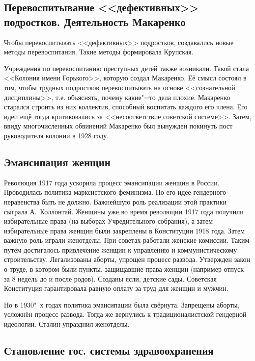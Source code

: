 \subsection{Перевоспитывание <<дефективных>> подростков. Деятельность Макаренко}

Чтобы перевоспитывать <<дефективных>> подростков, создавались новые методы перевоспитания. Такие методы формировала Крупская.

Учреждения по перевоспитанию преступных детей также возникали. Такой стала <<Колония имени Горького>>, которую создал Макаренко. Её смысл состоял в том, чтобы трудных подростков перевоспитывать на основе <<сознательной дисциплины>>, т.е. объяснять, почему какие"=то дела плохие. Макаренко старался строить из них коллектив, способный воспитать каждого его члена. Его идеи ещё тогда критиковались за <<несоответствие советской системе>>. Затем, ввиду многочисленных обвинений Макаренко был вынужден покинуть пост руководителя колонии в 1928 году.

\subsection{Эмансипация женщин}

Революция 1917 года ускорила процесс эмансипации женщин в России. Проводилась политика марксистского феминизма. По его идее гендерного неравенства быть не должно. Важнейшую роль реализации этой практики сыграла А.~Коллонтай. Женщины уже во время революции 1917 года получили избирательные права (на выборах Учредительного собрания), а затем избирательные права женщин были закреплены в Конституции 1918 года. Затем важную роль играли женотделы. При советах работали женские комиссии. Таким путём достигалось привлечение женщин к управлению и коммунистическому строительству. Легализованы аборты, упрощен процесс развода. Утвержден закон о труде, в котором были пункты, защищавшие права женщин (например отпуск за 8 недель до и после родов). Созданы ясли, детские сады. Советская Конституция гарантировала равную оплату за труд для женщин и мужчин. 

Но в 1930"~х годах политика эмансипации была свёрнута. Запрещены аборты, усложнён процесс развода. Тогда же вернулись к традиционалистской гендерной идеологии. Сталин упразднил женотделы.

\subsection{Становление гос. системы здравоохранения}

